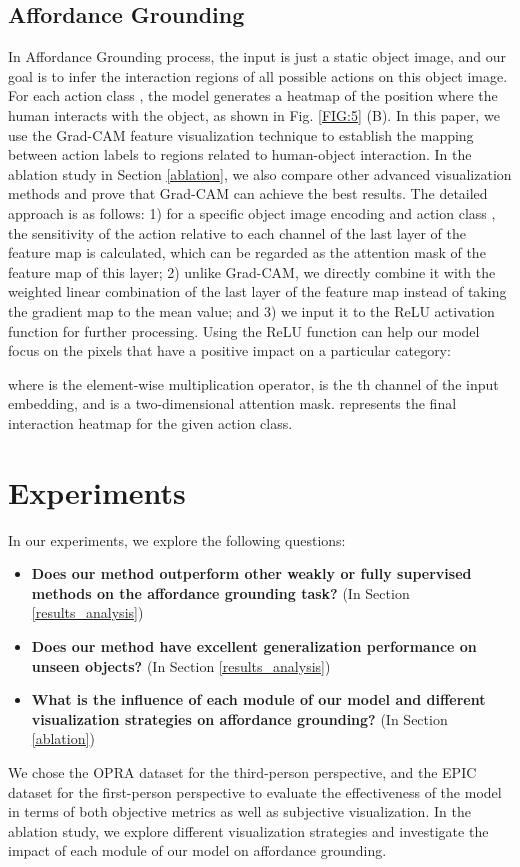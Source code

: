 \documentclass[journal,twoside]{IEEEtran}
\begin{document}
\subsection{Affordance Grounding}
\label{3.4}
\par In Affordance Grounding process, the input is just a static object image, and our goal is to infer the interaction regions of all possible actions on this object image. For each action class , the model generates a heatmap of the position where the human interacts with the object, as shown in Fig. \ref{FIG:5} (B). In this paper, we use the Grad-CAM \cite{selvaraju2017grad} feature visualization technique to establish the mapping between action labels to regions related to human-object interaction. In the ablation study in Section \ref{ablation}, we also compare other advanced visualization methods and prove that Grad-CAM can achieve the best results. The detailed approach is as follows: 1) for a specific object image encoding  and action class , the sensitivity of the action relative to each channel of the last layer of the feature map is calculated, which can be regarded as the attention mask of the feature map of this layer; 2) unlike Grad-CAM, we directly combine it with the weighted linear combination of the last layer of the feature map instead of taking the gradient map to the mean value; and 3) we input it to the ReLU activation function for further processing. Using the ReLU function can help our model focus on the pixels that have a positive impact on a particular category:

where  is the element-wise multiplication operator,   is the th channel of the input embedding, and  is a two-dimensional attention mask.  represents the final interaction heatmap for the given action class.

\section{Experiments}
In our experiments, we explore the following questions: 
\begin{itemize}
    \item []
     \textbf{Does our method outperform other weakly or fully supervised methods on the affordance grounding task?} (In Section \ref{results_analysis})
    \item []
     \textbf{Does our method have excellent generalization performance on unseen objects?} (In Section \ref{results_analysis})
    \item []
     \textbf{What is the influence of each module of our model and different visualization strategies on affordance grounding?} (In Section \ref{ablation})
\end{itemize}
\par We chose the OPRA \cite{demo2vec2018cvpr} dataset for the third-person perspective, and the EPIC \cite{Damen2018EPICKITCHENS} dataset for the first-person perspective to evaluate the effectiveness of the model in terms of both objective metrics as well as subjective visualization. In the ablation study, we explore different visualization strategies and investigate the impact of each module of our model on affordance grounding.
\end{document}

